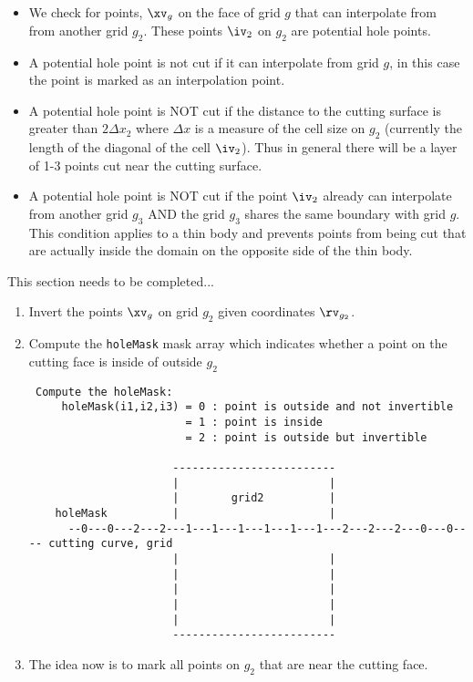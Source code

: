 \begin{itemize}
 \item We check for points, $\xv_g$ on the face of grid $g$ that can interpolate from 
   from another grid $g_2$. These points $\iv_2$ on $g_2$ are potential hole points.
 \item A potential hole point is not cut if it can interpolate from grid $g$, in this case the
     point is marked as an interpolation point.
 \item A potential hole point is NOT cut if the distance to the cutting surface is greater
    than $2 \Delta x_2$ where $\Delta x$ is a measure of the cell size on $g_2$ (currently
  the length of the diagonal of the cell $\iv_2$). Thus in general there will be a layer of
   1-3 points cut near the cutting surface.
 \item A potential hole point is NOT cut if the point $\iv_2$ already can interpolate from another grid $g_3$
    AND the grid $g_3$ shares the same boundary with grid $g$. This condition applies to a thin body and prevents
    points from being cut that are actually inside the domain on the opposite side of the thin body.
\end{itemize}

This section needs to be completed...
\begin{enumerate}
  \item Invert the points $\xv_g$ on grid $g_2$ given coordinates $\rv_{g_2}$.
  \item Compute the {\tt holeMask} mask array which indicates whether a point on the 
    cutting face is inside of outside $g_2$
\begin{verbatim}
 Compute the holeMask:
     holeMask(i1,i2,i3) = 0 : point is outside and not invertible
                        = 1 : point is inside
                        = 2 : point is outside but invertible

                      -------------------------
                      |                       |      
                      |        grid2          |      
    holeMask          |                       |      
      --0---0---2---2---1---1---1---1---1---1---2---2---2---0---0---- cutting curve, grid
                      |                       |      
                      |                       |      
                      |                       |      
                      |                       |      
                      |                       |      
                      -------------------------
\end{verbatim}
  \item The idea now is to mark all points on $g_2$ that are near the cutting face.
\end{enumerate}
  



